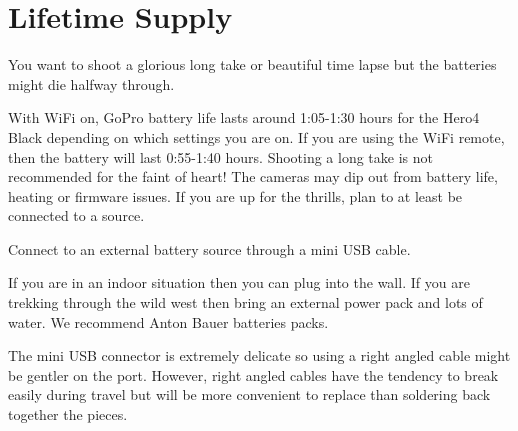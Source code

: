 \chapter{Lifetime Supply}
\pagecolor{white}
\label{chap:8}
\begin{fullwidth}


\problem

{\large You want to shoot a glorious long take or beautiful time lapse but the batteries might die halfway through. \par}

With WiFi on, GoPro battery life lasts around 1:05-1:30 hours for the Hero4 Black depending on which settings you are on. If you are using the WiFi remote, then the battery will last 0:55-1:40 hours. Shooting a long take is not recommended for the faint of heart! The cameras may dip out from battery life, heating or firmware issues. If you are up for the thrills, plan to at least be connected to a source. 


\solution

{\large Connect to an external battery source through a mini USB cable. \par}

If you are in an indoor situation then you can plug into the wall. If you are trekking through the wild west then bring an external power pack and lots of water. We recommend Anton Bauer batteries packs.


\tip The mini USB connector is extremely delicate so using a right angled cable might be gentler on the port. However, right angled cables have the tendency to break easily during travel but will be more convenient to replace than soldering back together the pieces. 





\clearpage
\end{fullwidth}
